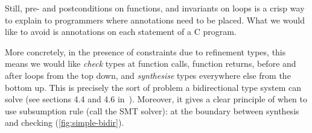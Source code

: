 Still, pre- and postconditions on functions, and invariants on loops is a crisp
way to explain to programmers where annotations need to be placed. What we
would like to avoid is annotations on each statement of a C program.

More concretely, in the presence of constraints due to refinement types, this
means we would like \emph{check} types at function calls, function returns,
before and after loops from the top down, and \emph{synthesise} types
everywhere else from the bottom up. This is precisely the sort of problem a
bidirectional type system can solve (see sections 4.4 and 4.6
in~). Moreover, it gives a clear principle of
when to use subsumption rule (call the SMT solver): at the boundary between
synthesis and checking (\cref{fig:simple-bidir}).

